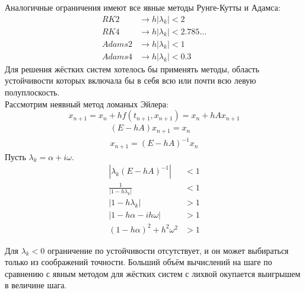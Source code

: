 \documentclass[a4paper,11pt]{article}
\begin{document}
Аналогичные ограничения имеют все явные методы Рунге-Кутты и Адамса:
\begin{align*}
  RK2    &\rightarrow h|\lambda_k| < 2 \\
  RK4    &\rightarrow h|\lambda_k| < 2.785\dots \\
  Adams2 &\rightarrow h|\lambda_k| < 1 \\
  Adams4 &\rightarrow h|\lambda_k| < 0.3
\end{align*}
Для решения жёстких систем хотелось бы применять методы, область устойчивости которых включала бы в себя всю или почти всю левую полуплоскость. \\
Рассмотрим неявный метод ломаных Эйлера:
\[x_{n+1} = x_n + hf(t_{n+1}, x_{n+1}) = x_n + hAx_{n+1}\]
\begin{gather*}
  (E - hA)x_{n+1} = x_n \\
  x_{n+1} = (E - hA)^{-1}x_n
\end{gather*}
Пусть $\lambda_k = \alpha + i\omega$.
\begin{align*}
  |\lambda_k(E - hA)^{-1}| &< 1 \\
  \frac{1}{|1 - h\lambda_k|} &< 1 \\
  |1 - h\lambda_k| &> 1 \\
  |1 - h\alpha - ih\omega| &> 1 \\
  (1 - h\alpha)^2 + h^2\omega^2 &> 1
\end{align*}
\begin{center}
\end{center}
Для $\lambda_k < 0$ ограничение по устойчивости отсутствует, и он может выбираться только из соображений точности. Больший объём вычислений на шаге по сравнению
  с явным методом для жёстких систем с лихвой окупается выигрышем в величине шага. \\
\end{document}
